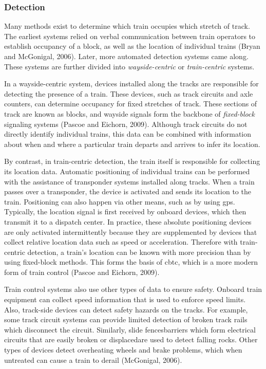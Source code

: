 \documentclass[11pt, titlepage]{article}
\begin{document}
\subsubsection{Detection}

Many methods exist to determine which train occupies which stretch of track. The
earliest systems relied on verbal communication between train operators to
establish occupancy of a block, as well as the location of individual trains
(Bryan and McGonigal, 2006). Later, more automated detection systems came along.
These systems are further divided into \textit{wayside-centric} or
\textit{train-centric} systems.

In a wayside-centric system, devices installed along the tracks are responsible
for detecting the presence of a train. These devices, such as track circuits and
axle counters, can determine occupancy for fixed stretches of track. These
sections of track are known as blocks, and wayside signals form the backbone of
\textit{fixed-block} signaling systems (Pascoe and Eichorn, 2009). Although track
circuits do not directly identify individual trains, this data can be combined
with information about when and where a particular train departs and arrives to
infer its location.

By contrast, in train-centric detection, the train itself is responsible for
collecting its location data. Automatic positioning of individual trains can be
performed with the assistance of transponder systems installed along tracks. When
a train passes over a transponder, the device is activated and sends its location
to the train. Positioning can also happen via other means, such as by using
\gls{gps}. Typically, the location signal is first received by onboard devices,
which then transmit it to a dispatch center. In practice, these absolute
positioning devices are only activated intermittently because they are
supplemented by devices that collect relative location data such as speed or
acceleration. Therefore with train-centric detection, a train’s location can be
known with more precision than by using fixed-block methods. This forms the basis
of \gls{cbtc}, which is a more modern form of train control (Pascoe and Eichorn,
2009).

Train control systems also use other types of data to ensure safety. Onboard train
equipment can collect speed information that is used to enforce speed limits.
Also, track-side devices can detect safety hazards on the tracks. For example,
some track circuit systems can provide limited detection of broken track rails
which disconnect the circuit. Similarly, slide fences\textemdash barriers which
form electrical circuits that are easily broken or displaced\textemdash are used
to detect falling rocks. Other types of devices detect overheating wheels and
brake problems, which when untreated can cause a train to derail (McGonigal,
2006).
\end{document}
